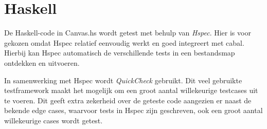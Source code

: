 \section{Haskell}
De Haskell-code in Canvas.hs wordt getest met behulp van \emph{Hspec}\cite{Hspec}. Hier is voor gekozen omdat Hspec relatief eenvoudig werkt en goed integreert met cabal. Hierbij kan Hspec automatisch de verschillende tests in een bestandsmap ontdekken en uitvoeren.

In samenwerking met Hspec wordt \emph{QuickCheck}\cite{QuickCheck} gebruikt. Dit veel gebruikte testframework maakt het mogelijk om een groot aantal willekeurige testcases uit te voeren. Dit geeft extra zekerheid over de geteste code aangezien er naast de bekende edge cases, waarvoor tests in Hspec zijn geschreven, ook een groot aantal willekeurige cases wordt getest.